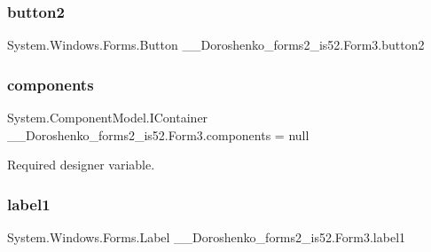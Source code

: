 \hypertarget{class__7___doroshenko__forms2__is52_1_1_form3_a5851399903c9a9d44cb388dde361a6e4}{}\label{class__7___doroshenko__forms2__is52_1_1_form3_a5851399903c9a9d44cb388dde361a6e4} 
\subsubsection{\texorpdfstring{button2}{button2}}
{\footnotesize\ttfamily System.\+Windows.\+Forms.\+Button \+\_\+\_\+\+Doroshenko\+\_\+forms2\+\_\+is52.\+Form3.\+button2\hspace{0.3cm}{\ttfamily [private]}}

\hypertarget{class__7___doroshenko__forms2__is52_1_1_form3_a1917fd652f94155fb7072082f7debd1f}{}\label{class__7___doroshenko__forms2__is52_1_1_form3_a1917fd652f94155fb7072082f7debd1f} 
\subsubsection{\texorpdfstring{components}{components}}
{\footnotesize\ttfamily System.\+Component\+Model.\+I\+Container \+\_\+\_\+\+Doroshenko\+\_\+forms2\+\_\+is52.\+Form3.\+components = null\hspace{0.3cm}{\ttfamily [private]}}



Required designer variable. 

\hypertarget{class__7___doroshenko__forms2__is52_1_1_form3_aefccf808eeaef9a4530d23034bf1431c}{}\label{class__7___doroshenko__forms2__is52_1_1_form3_aefccf808eeaef9a4530d23034bf1431c} 
\subsubsection{\texorpdfstring{label1}{label1}}
{\footnotesize\ttfamily System.\+Windows.\+Forms.\+Label \+\_\+\_\+\+Doroshenko\+\_\+forms2\+\_\+is52.\+Form3.\+label1\hspace{0.3cm}{\ttfamily [private]}}

